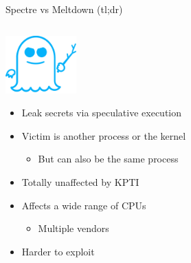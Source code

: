 \documentclass[10pt, dvipsnames, aspectratio=169]{beamer}
\begin{document}
\begin{frame}[c]{Spectre vs Meltdown (tl;dr)}
\begin{columns}
    \begin{column}[t]{0.5\textwidth}
      \centering
      \includegraphics[height=6em]{figs/logos/spectre.png}
      \begin{itemize}
        \item Leak secrets via speculative execution
        \item Victim is another process or the kernel
        \begin{itemize}
          \item But can also be the same process
        \end{itemize}
        \item Totally unaffected by KPTI
        \item Affects a wide range of CPUs
        \begin{itemize}
          \item Multiple vendors
        \end{itemize}
        \item Harder to exploit
      \end{itemize}
    \end{column}
  \end{columns}
\end{frame}
\endgroup
\end{document}
